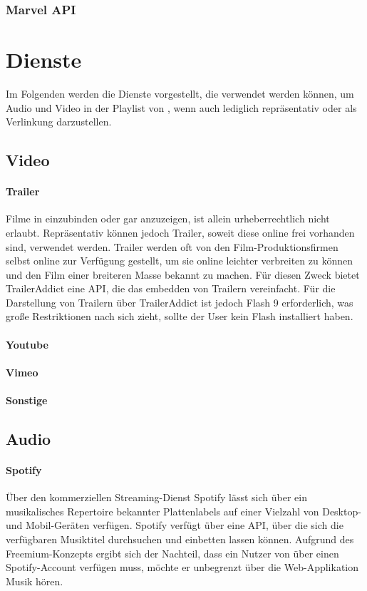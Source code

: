 \subsubsection{Marvel API}

\section{Dienste}
Im Folgenden werden die Dienste vorgestellt, die verwendet werden können, um Audio und Video in der Playlist von \arbeitstitel, wenn auch lediglich repräsentativ oder als Verlinkung darzustellen.
\subsection{Video}
\paragraph{Trailer}
Filme in \arbeitstitel einzubinden oder gar anzuzeigen, ist allein urheberrechtlich nicht erlaubt. Repräsentativ können jedoch Trailer, soweit diese online frei vorhanden sind, verwendet werden. Trailer werden oft von den Film-Produktionsfirmen selbst online zur Verfügung gestellt, um sie online leichter verbreiten zu können und den Film einer breiteren Masse bekannt zu machen. Für diesen Zweck bietet TrailerAddict eine API, die das embedden von Trailern vereinfacht. Für die Darstellung von Trailern über TrailerAddict ist jedoch Flash 9 erforderlich, was \uU große Restriktionen nach sich zieht, sollte der User kein Flash installiert haben.

\paragraph{Youtube}


\paragraph{Vimeo}

\paragraph{Sonstige}


\subsection{Audio}
\paragraph{Spotify}
Über den kommerziellen Streaming-Dienst Spotify lässt sich über ein musikalisches Repertoire bekannter Plattenlabels auf einer Vielzahl von Desktop- und Mobil-Geräten verfügen. Spotify verfügt über eine API, über die sich die verfügbaren Musiktitel durchsuchen und einbetten lassen können. Aufgrund des Freemium-Konzepts ergibt sich der Nachteil, dass ein Nutzer von \arbeitstitel über einen Spotify-Account verfügen muss, möchte er unbegrenzt über die Web-Applikation Musik hören.



